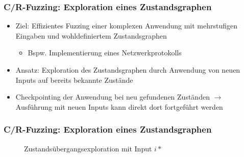 \documentclass[handout]{beamer}
\begin{document}
\begin{frame}
    \frametitle{C/R-Fuzzing: Exploration eines Zustandsgraphen}
    \begin{itemize}
        \item Ziel: Effizientes Fuzzing einer komplexen Anwendung mit mehrstufigen Eingaben und wohldefiniertem Zustandsgraphen
            \begin{itemize}
                \item Bspw. Implementierung eines Netzwerkprotokolls
            \end{itemize}
        \item Ansatz: Exploration des Zustandsgraphen durch Anwendung von neuen Inputs auf bereits bekannte Zustände
        \item Checkpointing der Anwendung bei neu gefundenen Zuständen $\rightarrow$ Ausführung mit neuen Inputs kann direkt dort fortgeführt werden
    \end{itemize}
\end{frame}

\begin{frame}
    \frametitle{C/R-Fuzzing: Exploration eines Zustandsgraphen}
    \begin{figure}[h]
        \begin{center}
        \end{center}
        \caption{Zustandsübergangsexploration mit Input $i*$}
    \end{figure}
\end{frame}
\end{document}
